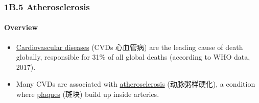 
\subsubsection{1B.5 Atherosclerosis}
\paragraph{Overview}
\begin{itemize}
    \item \underline{Cardiovascular diseases} (CVDs 心血管病) are the leading cause of death globally, responsible for 31\% of all
    global deaths (according to WHO data, 2017).
    \item Many CVDs are associated with \underline{atherosclerosis} (动脉粥样硬化), a condition where \underline{plaques} (斑块)
    build up inside arteries.
\end{itemize}

